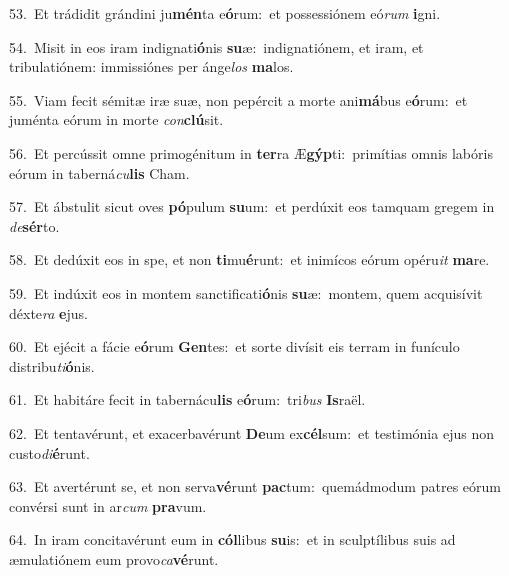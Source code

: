 {\numbfont\textcolor{\numbcolor}{53.}}~Et trádidit grándini ju\-\textbf{mén}\-ta e\-\textbf{ó}\-rum:~\star et possessiónem eó\textit{rum} \textbf{i}\-gni.\par
{\numbfont\textcolor{\numbcolor}{54.}}~Misit in eos iram indignati\-\textbf{ó}\-nis \textbf{su}\-æ:~\star indignatiónem, et iram, et tribulatiónem: immissiónes per ánge\textit{los} \textbf{ma}\-los.\par
{\numbfont\textcolor{\numbcolor}{55.}}~Viam fecit sémitæ iræ suæ, non pepércit a morte ani\-\textbf{má}\-bus e\-\textbf{ó}\-rum:~\star et juménta eórum in morte \textit{con}\-\textbf{clú}sit.\par
{\numbfont\textcolor{\numbcolor}{56.}}~Et percússit omne primogénitum in \textbf{ter}\-ra Æ\-\textbf{gýp}\-ti:~\star primítias omnis labóris eórum in taberná\-\textit{cu}\-\textbf{lis} Cham.\par
{\numbfont\textcolor{\numbcolor}{57.}}~Et ábstulit sicut oves \textbf{pó}\-pulum \textbf{su}\-um:~\star et perdúxit eos tamquam gregem in \textit{de}\-\textbf{sér}to.\par
{\numbfont\textcolor{\numbcolor}{58.}}~Et dedúxit eos in spe, et non \textbf{ti}\-mu\-\textbf{é}\-runt:~\star et inimícos eórum opéru\textit{it} \textbf{ma}\-re.\par
{\numbfont\textcolor{\numbcolor}{59.}}~Et indúxit eos in montem sanctificati\-\textbf{ó}\-nis \textbf{su}\-æ:~\star montem, quem acquisívit déxte\textit{ra} \textbf{e}\-jus.\par
{\numbfont\textcolor{\numbcolor}{60.}}~Et ejécit a fácie e\-\textbf{ó}\-rum \textbf{Gen}\-tes:~\star et sorte divísit eis terram in funículo distribu\-\textit{ti}\-\textbf{ó}nis.\par
{\numbfont\textcolor{\numbcolor}{61.}}~Et habitáre fecit in tabernácu\textbf{lis} e\-\textbf{ó}\-rum:~\star tri\textit{bus} \textbf{Is}\-raël.\par
{\numbfont\textcolor{\numbcolor}{62.}}~Et tentavérunt, et exacerbavérunt \textbf{De}\-um ex\-\textbf{cél}\-sum:~\star et testimónia ejus non custo\-\textit{di}\-\textbf{é}runt.\par
{\numbfont\textcolor{\numbcolor}{63.}}~Et avertérunt se, et non serva\-\textbf{vé}\-runt \textbf{pac}\-tum:~\star quemádmodum patres eórum convérsi sunt in ar\textit{cum} \textbf{pra}\-vum.\par
{\numbfont\textcolor{\numbcolor}{64.}}~In iram concitavérunt eum in \textbf{cól}\-libus \textbf{su}\-is:~\star et in sculptílibus suis ad æmulatiónem eum provo\-\textit{ca}\-\textbf{vé}runt.\par
